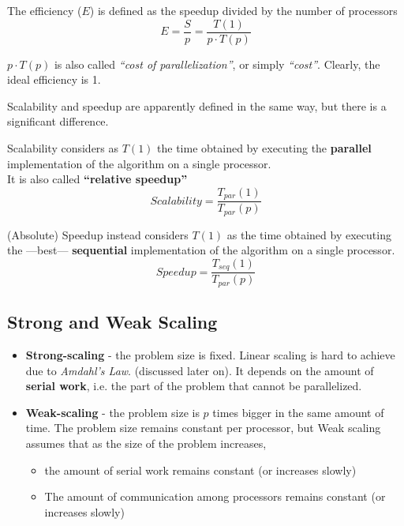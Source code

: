 \begin{definition}
   [Efficiency]
   The efficiency ($E$) is defined as the speedup divided by the number of processors
   \begin{equation}
      E = \frac{S}{p} = \frac{T(1)}{p \cdot T(p)}
   \end{equation}
\end{definition}

$p \cdot T(p)$ is also called \textit{``cost of parallelization''}, or simply \textit{``cost''}. Clearly, the ideal efficiency is 1.

Scalability and speedup are apparently defined in the same way, but there is a significant difference.

\begin{definition}
   [Scalability]
   Scalability considers as $T(1)$ the time obtained by executing the \textbf{parallel} implementation of the algorithm on a single processor.\\
   It is also called \textbf{``relative speedup''}
   \begin{equation}
      Scalability = \frac{T_{par}(1)}{T_{par}(p)}
   \end{equation}
\end{definition}

\begin{definition}
   (Absolute) Speedup instead considers $T(1)$ as the time obtained by executing the ---best--- \textbf{sequential} implementation of the algorithm on a single processor.
   \begin{equation}
      Speedup = \frac{T_{seq}(1)}{T_{par}(p)}
   \end{equation}
\end{definition}

\subsection{Strong and Weak Scaling}
\begin{itemize}
   \item \textbf{Strong-scaling} - the problem size is fixed. Linear scaling is hard to achieve due to \textit{Amdahl's Law}. (discussed later on).
   It depends on the amount of \textbf{serial work}, i.e. the part of the problem that cannot be parallelized.
   \item \textbf{Weak-scaling} - the problem size is $p$ times bigger in the same amount of time. The problem size remains constant per processor, but Weak scaling assumes that as the size of the problem increases, 
   \begin{itemize}
      \item the amount of serial work remains constant (or increases slowly)
      \item The amount of communication among processors remains constant (or increases slowly)
   \end{itemize}
\end{itemize}


